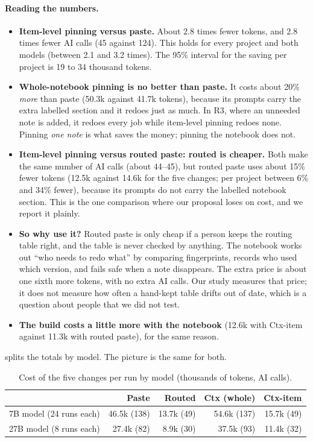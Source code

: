 \documentclass[10pt,a4paper]{article}
\begin{document}
\paragraph{Reading the numbers.}
\begin{itemize}[leftmargin=*]
\item \textbf{Item-level pinning versus paste.} About 2.8 times fewer tokens, and 2.8 times fewer AI calls (45
      against 124). This holds for every project and both models (between 2.1 and 3.2 times). The 95\% interval
      for the saving per project is 19 to 34 thousand tokens.
\item \textbf{Whole-notebook pinning is no better than paste.} It costs about 20\% \emph{more} than paste (50.3k
      against 41.7k tokens), because its prompts carry the extra labelled section and it redoes just as much. In
      R3, where an unneeded note is added, it redoes every job while item-level pinning redoes none. Pinning
      \emph{one note} is what saves the money; pinning the notebook does not.
\item \textbf{Item-level pinning versus routed paste: routed is cheaper.} Both make the same number of AI calls
      (about 44--45), but routed paste uses about 15\% fewer tokens (12.5k against 14.6k for the five changes; per
      project between 6\% and 34\% fewer), because its prompts do not carry the labelled notebook section.
      This is the one comparison where our proposal loses on cost, and we report it plainly.
\item \textbf{So why use it?} Routed paste is only cheap if a person keeps the routing table right, and the table
      is never checked by anything. The notebook works out ``who needs to redo what'' by comparing fingerprints,
      records who used which version, and fails safe when a note disappears. The extra price is about one sixth
      more tokens, with no extra AI calls. Our study measures that price; it does not measure how often a
      hand-kept table drifts out of date, which is a question about people that we did not test.
\item \textbf{The build costs a little more with the notebook} (12.6k with Ctx-item against 11.3k with routed
      paste), for the same reason.
\end{itemize}

 splits the totals by model. The picture is the same for both.

\begin{table}[h]
\centering\small
\caption{Cost of the five changes per run by model (thousands of tokens, AI calls).}
\label{tab:models}
\begin{tabular}{@{}l r r r r@{}}
\toprule
 & Paste & Routed & Ctx (whole) & Ctx-item \\
\midrule
7B model (24 runs each) & 46.5k (138) & 13.7k (49) & 54.6k (137) & 15.7k (49) \\
27B model (8 runs each) & 27.4k (82) & 8.9k (30) & 37.5k (93) & 11.4k (32) \\
\bottomrule
\end{tabular}
\end{table}
\end{document}
